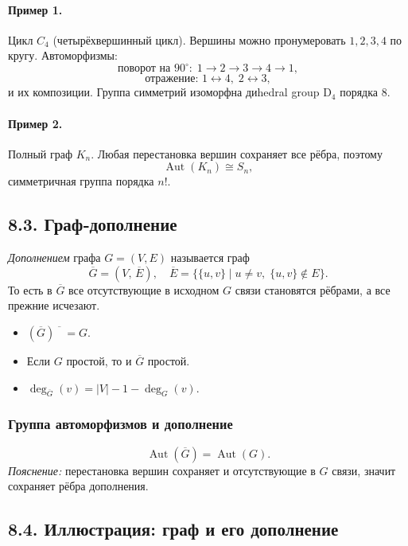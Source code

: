 \documentclass{article}
\begin{document}
\paragraph{Пример 1.} Цикл $C_4$ (четырёхвершинный цикл).  
Вершины можно пронумеровать $1,2,3,4$ по кругу. Автоморфизмы:
\[
  \text{поворот на }90^\circ:\;1\to2\to3\to4\to1,
\]
\[
  \text{отражение: }1\leftrightarrow4,\;2\leftrightarrow3,
\]
и их композиции. Группа симметрий изоморфна диhedral group $\mathrm{D}_4$ порядка 8.

\paragraph{Пример 2.} Полный граф $K_n$.  
Любая перестановка вершин сохраняет все рёбра, поэтому
\[
  \operatorname{Aut}(K_n)\cong S_n,
\]
симметричная группа порядка $n!$.

\subsection*{8.3. Граф‑дополнение}

\emph{Дополнением} графа $G=(V,E)$ называется граф
\[
  \overline{G} = (V,\,\overline{E}),
  \quad \overline{E} = \bigl\{\{u,v\}\mid u\neq v,\;\{u,v\}\notin E\bigr\}.
\]
То есть в $\overline{G}$ все отсутствующие в исходном $G$ связи становятся рёбрами, а все прежние исчезают.

\begin{itemize}[leftmargin=*]
  \item $(\overline{G})\!\!\overline{\phantom{G}} = G$.
  \item Если $G$ простой, то и $\overline{G}$ простой.
  \item $\deg_{\overline G}(v) = |V|-1 - \deg_G(v)$.
\end{itemize}

\subsubsection*{Группа автоморфизмов и дополнение}

\vspace{-0.3em}
\[
  \operatorname{Aut}(\overline{G}) = \operatorname{Aut}(G).
\]
\emph{Пояснение:} перестановка вершин сохраняет и отсутствующие в $G$ связи, значит сохраняет рёбра дополнения.

\subsection*{8.4. Иллюстрация: граф и его дополнение}
\end{document}
